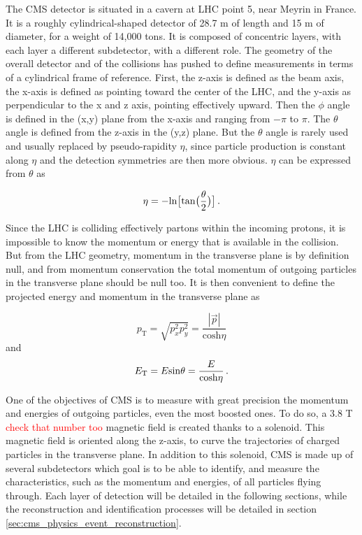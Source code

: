 The CMS detector is situated in a cavern at LHC point 5, near Meyrin in France. It is a roughly cylindrical-shaped detector of 28.7 m of length and 15 m of diameter, for a weight of 14,000 tons. It is composed of concentric layers, with each layer a different subdetector, with a different role. The geometry of the overall detector and of the collisions has pushed to define measurements in terms of a cylindrical frame of reference. First, the z-axis is defined as the beam axis, the x-axis is defined as pointing toward the center of the LHC, and the y-axis as perpendicular to the x and z axis, pointing effectively upward. Then the $\phi$ angle is defined in the (x,y) plane from the x-axis and ranging from $-\pi$ to $\pi$. The $\theta$ angle is defined from the z-axis in the (y,z) plane. But the $\theta$ angle is rarely used and usually replaced by pseudo-rapidity $\eta$, since particle production is constant along $\eta$ and the detection symmetries are then more obvious. $\eta$ can be expressed from $\theta$ as

\begin{equation}
    \eta = - \mathrm{ln} \big[ \mathrm{tan} \big(\frac{\theta}{2}\big)\big] \mend
\end{equation}

Since the LHC is colliding effectively partons within the incoming protons, it is impossible to know the momentum or energy that is available in the collision. But from the LHC geometry, momentum in the transverse plane is by definition null, and from momentum conservation the total momentum of outgoing particles in the transverse plane should be null too. It is then convenient to define the projected energy and momentum in the transverse plane as

\begin{equation}
    p_{\mathrm{T}} = \sqrt{p_{x}^2 p_{y}^2} = \frac{|\Vec{p}|}{\mathrm{cosh} \eta}
\end{equation}
and 
\begin{equation}
    E_{\mathrm{T}} = E \mathrm{sin} \theta = \frac{E}{\mathrm{cosh} \eta} \mend
\end{equation}

One of the objectives of CMS is to measure with great precision the momentum and energies of outgoing particles, even the most boosted ones. To do so, a 3.8 T \textcolor{red}{check that number too} magnetic field is created thanks to a solenoid. This magnetic field is oriented along the z-axis, to curve the trajectories of charged particles in the transverse plane. In addition to this solenoid, CMS is made up of several subdetectors which goal is to be able to identify, and measure the characteristics, such as the momentum and energies, of all particles flying through. Each layer of detection will be detailed in the following sections, while the reconstruction and identification processes will be detailed in section \ref{sec:cms_physics_event_reconstruction}.

